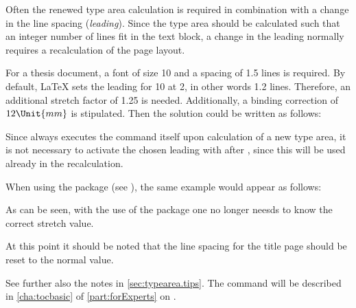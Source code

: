 Often the renewed type area calculation is required in combination
with a change in the line spacing
(\emph{leading}). Since the type area should be
calculated such that an integer number of lines fit in the text block,
a change in the leading normally requires a recalculation of the page
layout.
 
\begin{Example}
  For a thesis document, a font of size 10 and a spacing of
  1.5 lines is required. By default, {\LaTeX} sets the leading for
  10 at 2, in other words 1.2 lines. Therefore, an
  additional stretch factor of 1.25 is needed. Additionally, a binding
  correction of \(12\Unit{mm}\) is stipulated. Then the solution could be
  written as follows:
Since  always executes the command
 itself upon calculation of a new type area, it is
not necessary to activate the chosen leading with 
after , since this will be used already in the
recalculation.

When using the  package (see
\cite{package:setspace}), the same example would appear as follows:
As can be seen, with the use of the  package one no
longer neesds to know the correct stretch value.

At this point it should be noted that the line spacing for the title
page should be reset to the normal value.
\iffalse%
  A complete example would be:
\fi
{}
  See further also the notes in \autoref{sec:typearea.tips}. The command
   will be described
  in \autoref{cha:tocbasic} of \autoref{part:forExperts} on
  .
\end{Example}

